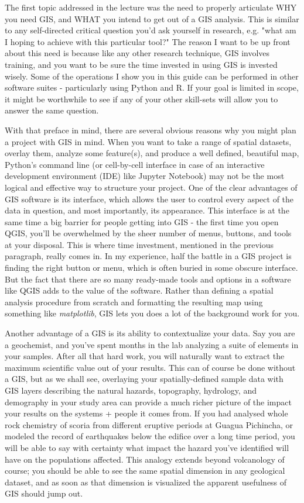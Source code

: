 \documentclass{article}
\begin{document}
The first topic addressed in the lecture was the need to properly articulate WHY you need GIS, and WHAT you intend to get out of a GIS analysis. This is similar to any self-directed critical question you'd ask yourself in research, e.g. "what am I hoping to achieve with this particular tool?" The reason I want to be up front about this need is because like any other research technique, GIS involves training, and you want to be sure the time invested in using GIS is invested wisely. Some of the operations I show you in this guide can be performed in other software suites - particularly using Python and R. If your goal is limited in scope, it might be worthwhile to see if any of your other skill-sets will allow you to answer the same question. 

With that preface in mind, there are several obvious reasons why you might plan a project with GIS in mind. When you want to take a range of spatial datasets, overlay them, analyze some feature(s), and produce a well defined, beautiful map, Python's command line (or cell-by-cell interface in case of an interactive development environment (IDE) like Jupyter Notebook) may not be the most logical and effective way to structure your project. One of the clear advantages of GIS software is its interface, which allows the user to control every aspect of the data in question, and most importantly, its appearance. This interface is at the same time a big barrier for people getting into GIS - the first time you open QGIS, you'll be overwhelmed by the sheer number of menus, buttons, and tools at your disposal. This is where time investment, mentioned in the previous paragraph, really comes in. In my experience, half the battle in a GIS project is finding the right button or menu, which is often buried in some obscure interface. But the fact that there are so many ready-made tools and options in a software like QGIS adds to the value of the software. Rather than defining a spatial analysis procedure from scratch and formatting the resulting map using something like \textit{matplotlib}, GIS lets you does a lot of the background work for you. 

Another advantage of a GIS is its ability to contextualize your data. Say you are a geochemist, and you've spent months in the lab analyzing a suite of elements in your samples. After all that hard work, you will naturally want to extract the maximum scientific value out of your results. This can of course be done without a GIS, but as we shall see, overlaying your spatially-defined sample data with GIS layers describing the natural hazards, topography, hydrology, and demography in your study area can provide a much richer picture of the impact your results on the systems + people it comes from. If you had analysed whole rock chemistry of scoria from different eruptive periods at Guagua Pichincha, or modeled the record of earthquakes below the edifice over a long time period, you will be able to say with certainty what impact the hazard you've identified will have on the populations affected. This analogy extends beyond volcanology of course; you should be able to see the same spatial dimension in any geological dataset, and as soon as that dimension is visualized the apparent usefulness of GIS should jump out. 
\end{document}

